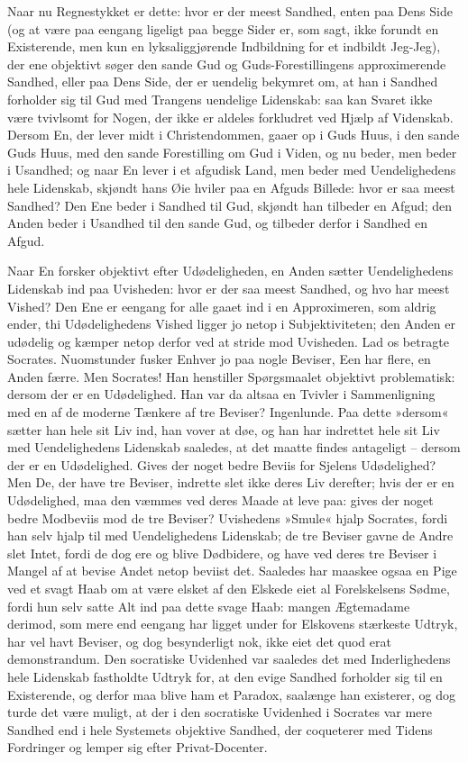 \documentclass[12pt,a4paper]{article}
\begin{document}
Naar nu Regnestykket er dette: hvor er der meest Sandhed, enten paa Dens Side (og at være paa eengang ligeligt paa begge Sider er, som sagt, ikke forundt en Existerende, men kun en lyksaliggjørende Indbildning for et indbildt Jeg-Jeg), der ene objektivt søger den sande Gud og Guds-Forestillingens approximerende Sandhed, eller paa Dens Side, der er uendelig bekymret om, at han i Sandhed forholder sig til Gud med Trangens uendelige Lidenskab: saa kan Svaret ikke være tvivlsomt for Nogen, der ikke er aldeles forkludret ved Hjælp af Videnskab. Dersom En, der lever midt i Christendommen, gaaer op i Guds Huus, i den sande Guds Huus, med den sande Forestilling om Gud i Viden, og nu beder, men beder i Usandhed; og naar En lever i et afgudisk Land, men beder med Uendelighedens hele Lidenskab, skjøndt hans Øie hviler paa en Afguds Billede: hvor er saa meest Sandhed? Den Ene beder i Sandhed til Gud, skjøndt han tilbeder en Afgud; den Anden beder i Usandhed til den sande Gud, og tilbeder derfor i Sandhed en Afgud.

Naar En forsker objektivt efter Udødeligheden, en Anden sætter Uendelighedens Lidenskab ind paa Uvisheden: hvor er der saa meest Sandhed, og hvo har meest Vished? Den Ene er eengang for alle gaaet ind i en Approximeren, som aldrig ender, thi Udødelighedens Vished ligger jo netop i Subjektiviteten; den Anden er udødelig og kæmper netop derfor ved at stride mod Uvisheden. Lad os betragte Socrates. Nuomstunder fusker Enhver jo paa nogle Beviser, Een har flere, en Anden færre. Men Socrates! Han henstiller Spørgsmaalet objektivt problematisk: dersom der er en Udødelighed. Han var da altsaa en Tvivler i Sammenligning med en af de moderne Tænkere af tre Beviser? Ingenlunde. Paa dette »dersom« sætter han hele sit Liv ind, han vover at døe, og han har indrettet hele sit Liv med Uendelighedens Lidenskab saaledes, at det maatte findes antageligt – dersom der er en Udødelighed. Gives der noget bedre Beviis for Sjelens Udødelighed? Men De, der have tre Beviser, indrette slet ikke deres Liv derefter; hvis der er en Udødelighed, maa den væmmes ved deres Maade at leve paa: gives der noget bedre Modbeviis mod de tre Beviser? Uvishedens »Smule« hjalp Socrates, fordi han selv hjalp til med Uendelighedens Lidenskab; de tre Beviser gavne de Andre slet Intet, fordi de dog ere og blive Dødbidere, og have ved deres tre Beviser i Mangel af at bevise Andet netop beviist det. Saaledes har maaskee ogsaa en Pige ved et svagt Haab om at være elsket af den Elskede eiet al Forelskelsens Sødme, fordi hun selv satte Alt ind paa dette svage Haab: mangen Ægtemadame derimod, som mere end eengang har ligget under for Elskovens stærkeste Udtryk, har vel havt Beviser, og dog besynderligt nok, ikke eiet det quod erat demonstrandum. Den socratiske Uvidenhed var saaledes det med Inderlighedens hele Lidenskab fastholdte Udtryk for, at den evige Sandhed forholder sig til en Existerende, og derfor maa blive ham et Paradox, saalænge han existerer, og dog turde det være muligt, at der i den socratiske Uvidenhed i Socrates var mere Sandhed end i hele Systemets objektive Sandhed, der coqueterer med Tidens Fordringer og lemper sig efter Privat-Docenter.
\end{document}
